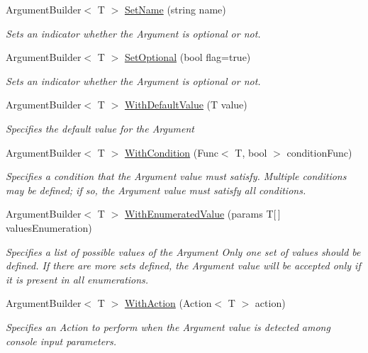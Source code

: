 \begin{DoxyCompactItemize}
\item 
Argument\+Builder$<$ T $>$ \hyperlink{class_arguments_library_1_1_builders_1_1_argument_builder_3_01_t_01_4_ae752f91c46fa992290bebce9e223cdb1}{Set\+Name} (string name)
\begin{DoxyCompactList}\small\item\em Sets an indicator whether the Argument is optional or not. \end{DoxyCompactList}\item 
Argument\+Builder$<$ T $>$ \hyperlink{class_arguments_library_1_1_builders_1_1_argument_builder_3_01_t_01_4_abf30984878e453465d2ef18bb7f4e0ff}{Set\+Optional} (bool flag=true)
\begin{DoxyCompactList}\small\item\em Sets an indicator whether the Argument is optional or not. \end{DoxyCompactList}\item 
Argument\+Builder$<$ T $>$ \hyperlink{class_arguments_library_1_1_builders_1_1_argument_builder_3_01_t_01_4_a82dd58f876ebaf56e9757f5266e75def}{With\+Default\+Value} (T value)
\begin{DoxyCompactList}\small\item\em Specifies the default value for the Argument \end{DoxyCompactList}\item 
Argument\+Builder$<$ T $>$ \hyperlink{class_arguments_library_1_1_builders_1_1_argument_builder_3_01_t_01_4_ad2c5f072435a3224f2ee2e5bdf1430b7}{With\+Condition} (Func$<$ T, bool $>$ condition\+Func)
\begin{DoxyCompactList}\small\item\em Specifies a condition that the Argument value must satisfy. Multiple conditions may be defined; if so, the Argument value must satisfy all conditions. \end{DoxyCompactList}\item 
Argument\+Builder$<$ T $>$ \hyperlink{class_arguments_library_1_1_builders_1_1_argument_builder_3_01_t_01_4_a3b78d6350edb843cae21790560515305}{With\+Enumerated\+Value} (params T\mbox{[}$\,$\mbox{]} values\+Enumeration)
\begin{DoxyCompactList}\small\item\em Specifies a list of possible values of the Argument Only one set of values should be defined. If there are more sets defined, the Argument value will be accepted only if it is present in all enumerations. \end{DoxyCompactList}\item 
Argument\+Builder$<$ T $>$ \hyperlink{class_arguments_library_1_1_builders_1_1_argument_builder_3_01_t_01_4_ad68e19a6fb07e9b91835e110577669b9}{With\+Action} (Action$<$ T $>$ action)
\begin{DoxyCompactList}\small\item\em Specifies an Action to perform when the Argument value is detected among console input parameters. \end{DoxyCompactList}\end{DoxyCompactItemize}


